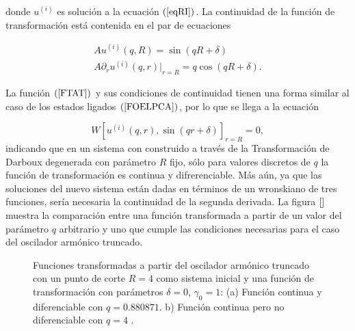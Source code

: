 donde $u^{(i)}$ es solución a la ecuación $(\ref{eqRI})$. La continuidad de la función de transformación está contenida en el par de ecuaciones 

\begin{eqnarray}
\label{ccuT1}
A u^{(i)}(q,R)= \sin(qR + \delta)\\[0.3cm]
\label{ccuT2}
A \partial_r u^{(i)}(q,r)|_{r=R}= q\cos(qR + \delta).
\end{eqnarray} 

La función $(\ref{FTAT})$ y sus condiciones de continuidad tienen una  forma similar al caso de los estados ligados $(\ref{FOELPCA})$, por lo que se llega a la ecuación

\begin{equation*}
W[u^{(i)}(q,r), \sin(qr + \delta)]_{r = R} = 0,
\end{equation*} 
indicando que en un sistema con construido a través de la Transformación de Darboux degenerada con parámetro $R$ fijo, sólo para valores discretos de $q$ la función de transformación es continua y difrerenciable. Más aún, ya que las soluciones del nuevo sistema están dadas en términos de un wronskiano de tres funciones, sería necesaria la continuidad de la segunda derivada. La figura $\ref{}$ muestra la comparación entre una función transformada a partir de un valor del parámetro $q$ arbitrario y uno que cumple las condiciones necesarias para el caso del oscilador armónico truncado.

\begin{figure}
	\centering
	\hfill%
	\caption{\label{Figure CDNDTF} Funciones transformadas a partir del oscilador armónico truncado con un punto de corte $R=4$ como sistema inicial  y una  función de transformación con parámetros $\delta=0$, $\gamma_0 = 1$:  (a) Función continua y diferenciable con $q=0.880871$.
		b) Función continua pero no diferenciable con $q=4$ .}
\end{figure} 

